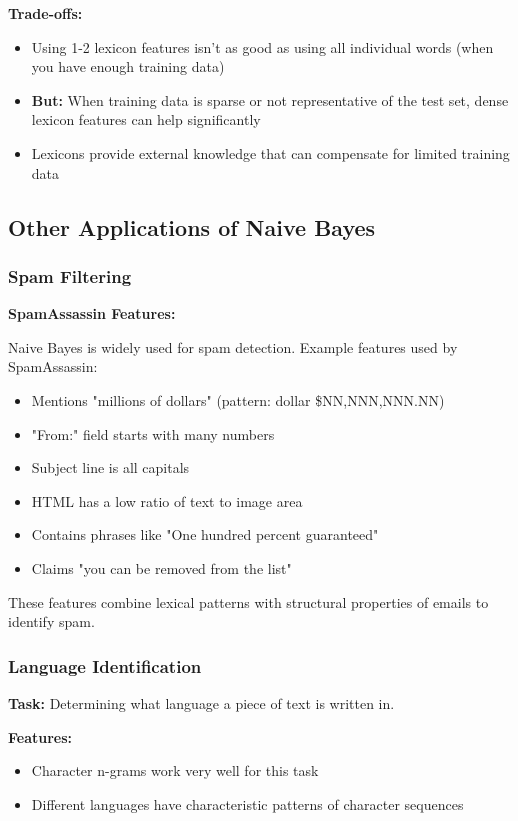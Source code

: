 \documentclass[11pt,a4paper]{article}
\theoremstyle{definition}
\theoremstyle{plain}
\theoremstyle{remark}
\begin{document}
\textbf{Trade-offs:}
\begin{itemize}
    \item Using 1-2 lexicon features isn't as good as using all individual words (when you have enough training data)
    \item \textbf{But:} When training data is sparse or not representative of the test set, dense lexicon features can help significantly
    \item Lexicons provide external knowledge that can compensate for limited training data
\end{itemize}

\subsection{Other Applications of Naive Bayes}

\subsubsection{Spam Filtering}

\textbf{SpamAssassin Features:}

Naive Bayes is widely used for spam detection. Example features used by SpamAssassin:

\begin{itemize}
    \item Mentions "millions of dollars" (pattern: dollar \$NN,NNN,NNN.NN)
    \item "From:" field starts with many numbers
    \item Subject line is all capitals
    \item HTML has a low ratio of text to image area
    \item Contains phrases like "One hundred percent guaranteed"
    \item Claims "you can be removed from the list"
\end{itemize}

These features combine lexical patterns with structural properties of emails to identify spam.

\subsubsection{Language Identification}

\textbf{Task:} Determining what language a piece of text is written in.

\textbf{Features:}
\begin{itemize}
    \item Character n-grams work very well for this task
    \item Different languages have characteristic patterns of character sequences
\end{itemize}
\end{document}
